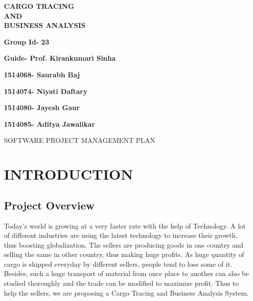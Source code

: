 \documentclass[10pt]{article}
\date{}
\begin{document}
    \begin{center}
        \Huge{ \textbf{ CARGO TRACING \\ AND \\ BUSINESS ANALYSIS} }
    
   
      \textbf{
     \Huge{ \newline \newline \newline  \newline    Group Id- 23 }  }
     
     \textbf{
     \Huge{ \newline  Guide- Prof. Kirankumari Sinha \newline} }
     
     \textbf{
     \Huge{ 1514068- Saurabh Baj} }
     
     \textbf{
     \Huge{  1514074- Niyati Daftary} }
     
     \textbf{
     \Huge{ 1514080- Jayesh Gaur} }
     
     \textbf{
     \Huge{ 1514085- Aditya Jawalikar} }
     
     \end{center}
     
   
    \newpage
    
    \begin{flushright}
	\newline \newline 
    \begin{bfseries}
        \Huge{ SOFTWARE PROJECT MANAGEMENT PLAN}\\
        \vspace{1.9cm}
    
    \end{bfseries}
\end{flushright}
\newpage
\tableofcontents
\newpage
\section{INTRODUCTION}
\subsection{Project Overview}
Today’s world is growing at a very faster rate with the help of Technology. A lot of different industries are using the latest technology to increase their growth, thus boosting globalization. The sellers are producing goods in one country and selling the same in other country, thus making huge profits. As huge quantity of cargo is shipped everyday by different sellers, people tend to lose some of it. Besides, such a huge transport of material from once place to another can also be studied thoroughly and the trade can be modified to maximize profit. Thus to help the sellers, we are proposing a Cargo Tracing and Business Analysis System. 
\end{document}
